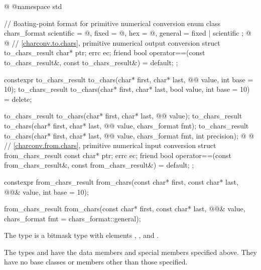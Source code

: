 %
\begin{codeblock}
@%
%
%
%
%
%
@namespace std {
  // floating-point format for primitive numerical conversion
  enum class chars_format {
    scientific = @\unspec@,
    fixed = @\unspec@,
    hex = @\unspec@,
    general = fixed | scientific
  };
@%
%
%
@
  // \ref{charconv.to.chars}, primitive numerical output conversion
  struct to_chars_result {
    char* ptr;
    errc ec;
    friend bool operator==(const to_chars_result&, const to_chars_result&) = default;
  };

  constexpr to_chars_result to_chars(char* first, char* last, @@ value, int base = 10);
  to_chars_result to_chars(char* first, char* last, bool value, int base = 10) = delete;

  to_chars_result to_chars(char* first, char* last, @@ value);
  to_chars_result to_chars(char* first, char* last, @@ value, chars_format fmt);
  to_chars_result to_chars(char* first, char* last, @@ value,
                           chars_format fmt, int precision);
@%
%
%
@
  // \ref{charconv.from.chars}, primitive numerical input conversion
  struct from_chars_result {
    const char* ptr;
    errc ec;
    friend bool operator==(const from_chars_result&, const from_chars_result&) = default;
  };

  constexpr from_chars_result from_chars(const char* first, const char* last,
                                         @@& value, int base = 10);

  from_chars_result from_chars(const char* first, const char* last, @@& value,
                               chars_format fmt = chars_format::general);
}
\end{codeblock}

\pnum
The type  is a bitmask type
with elements , , and .

\pnum
The types  and 
have the data members and special members specified above.
They have no base classes or members other than those specified.

